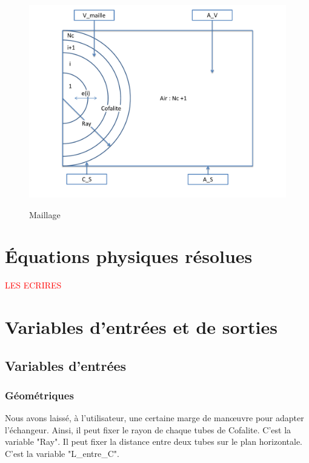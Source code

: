 \begin{figure}[!h]
\centering
\caption{Maillage}
\includegraphics[scale=0.5]{PHOTO/Shema_maillage.pdf}
\label{maillage}
\end{figure}



\newpage


\section{Équations physiques résolues}
\textcolor{red}{LES ECRIRES}


\section{Variables d'entrées et de sorties}

	\subsection{Variables d'entrées}
	
		\subsubsection{Géométriques}
		
		Nous avons laissé, à l'utilisateur, une certaine marge de manœuvre pour adapter l'échangeur. 
		Ainsi, il peut fixer le rayon de chaque tubes de Cofalite. C'est la variable "Ray". 
		Il peut fixer la distance entre deux tubes sur le plan horizontale. C'est la variable "L\_entre\_C".
		
